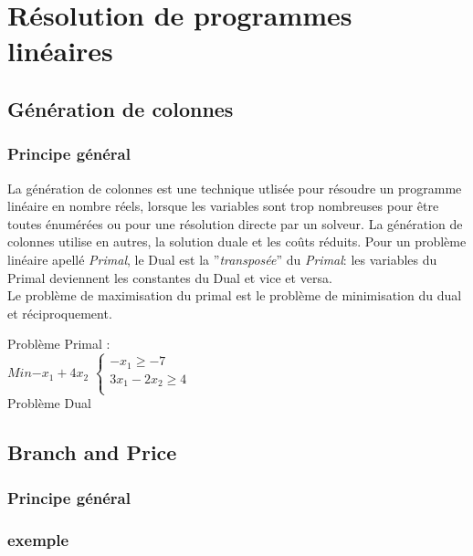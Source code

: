 \section{Résolution de programmes linéaires}

\subsection{Génération de colonnes}
\subsubsection{Principe général}
La génération de colonnes est une technique utlisée pour résoudre un programme linéaire en nombre réels, lorsque les variables sont trop nombreuses pour être toutes énumérées ou pour une résolution directe par un solveur. La génération de colonnes utilise en autres, la solution duale et les coûts réduits. \cite{introBCBP}
Pour un problème linéaire apellé \textit{Primal}, le Dual est la ''\textit{transposée}'' du \textit{Primal}: les variables du Primal deviennent les constantes du Dual et vice et versa. \\
Le problème de maximisation du primal est le problème de minimisation du dual et réciproquement.


\begin{multicols}{2}
Problème Primal : \\
$Min{ - x_1 + 4x_2}$
\newline
$\left\lbrace
\begin{array}{l}
-x_1\geq -7\\
3x_1-2x_2 \geq 4\\
\end{array}
\right.$
\\ 
Problème Dual
\end{multicols}

\subsection{Branch and Price}
\subsubsection{Principe général}

\subsubsection{exemple}